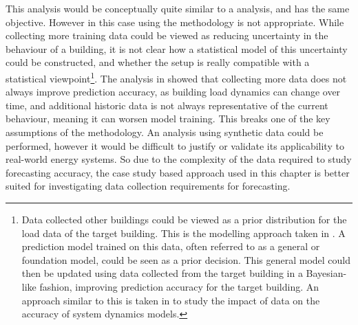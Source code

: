 This analysis would be conceptually quite similar to a  analysis, and has the same objective. However in this case using the  methodology is not appropriate. While collecting more training data could be viewed as reducing uncertainty in the behaviour of a building, it is not clear how a statistical model of this uncertainty could be constructed, and whether the setup is really compatible with a statistical viewpoint\footnote{Data collected other buildings could be viewed as a prior distribution for the load data of the target building. This is the modelling approach taken in . A prediction model trained on this data, often referred to as a general or foundation model, could be seen as a prior decision. This general model could then be updated using data collected from the target building in a Bayesian-like fashion, improving prediction accuracy for the target building. An approach similar to this is taken in \citep{raisch2025AdaptingChangeComparison} to study the impact of data on the accuracy of system dynamics models.}.
The analysis in  showed that collecting more data does not always improve prediction accuracy, as building load dynamics can change over time, and additional historic data is not always representative of the current behaviour, meaning it can worsen model training. This breaks one of the key assumptions of the  methodology. An analysis using synthetic data could be performed, however it would be difficult to justify or validate its applicability to real-world energy systems.
So due to the complexity of the data required to study forecasting accuracy, the case study based approach used in this chapter is better suited for investigating data collection requirements for forecasting.


